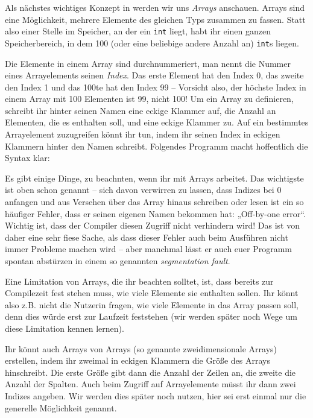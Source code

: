 
Als nächstes wichtiges Konzept in \Cpp werden wir uns \emph{Arrays} anschauen.
Arrays sind eine Möglichkeit, mehrere Elemente des gleichen Typs zusammen zu
fassen. Statt also einer Stelle im Speicher, an der ein \texttt{int} liegt,
habt ihr einen ganzen Speicherbereich, in dem 100 (oder eine beliebige andere
Anzahl an) \texttt{int}s liegen.

Die Elemente in einem Array sind durchnummeriert, man nennt die Nummer eines
Arrayelements seinen \emph{Index}. Das erste Element hat den Index 0, das
zweite den Index 1 und das 100te hat den Index 99 -- Vorsicht also, der höchste
Index in einem Array mit 100 Elementen ist 99, nicht 100! Um ein Array zu
definieren, schreibt ihr hinter seinen Namen eine eckige Klammer auf, die
Anzahl an Elementen, die es enthalten soll, und eine eckige Klammer zu. Auf ein
bestimmtes Arrayelement zuzugreifen könnt ihr tun, indem ihr seinen Index in
eckigen Klammern hinter den Namen schreibt. Folgendes Programm macht
hoffentlich die Syntax klar:

Es gibt einige Dinge, zu beachnten, wenn ihr mit Arrays arbeitet. Das
wichtigste ist oben schon genannt -- sich davon verwirren zu lassen, dass
Indizes bei 0 anfangen und aus Versehen über das Array hinaus schreiben oder
lesen ist ein so häufiger Fehler, dass er seinen eigenen Namen bekommen hat:
„Off-by-one error“. Wichtig ist, dass der Compiler diesen Zugriff nicht
verhindern wird! Das ist von daher eine sehr fiese Sache, als dass dieser
Fehler auch beim Ausführen nicht immer Probleme machen wird -- aber manchmal
lässt er auch euer Programm spontan abstürzen in einem so genannten
\emph{segmentation fault}.

Eine Limitation von Arrays, die ihr beachten solltet, ist, dass bereits zur
Compilezeit fest stehen muss, wie viele Elemente sie enthalten sollen. Ihr
könnt also z.B. nicht die Nutzerin fragen, wie viele Elemente in das Array
passen soll, denn dies würde erst zur Laufzeit feststehen (wir werden später
noch Wege um diese Limitation kennen lernen).

Ihr könnt auch Arrays von Arrays (so genannte zweidimensionale Arrays)
erstellen, indem ihr zweimal in eckigen Klammern die Größe des Arrays
hinschreibt. Die erste Größe gibt dann die Anzahl der Zeilen an, die zweite die
Anzahl der Spalten. Auch beim Zugriff auf Arrayelemente müsst ihr dann zwei
Indizes angeben. Wir werden dies später noch nutzen, hier sei erst einmal nur
die generelle Möglichkeit genannt.

